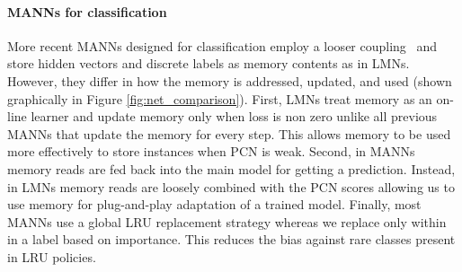 \documentclass[letterpaper]{article} %
\newcommand{\vek}[1]{{\bf {#1}}}
\newcommand{\vh}{{\vek{h}}}
\def\sunita#1{\todo [color=purple]{Sunita: #1}}
\begin{document}


\paragraph{MANNs for classification}
More recent MANNs designed for classification employ a looser coupling~\cite{kaiser2017,SantoroBBWL16} and store hidden vectors and discrete labels as memory contents as in LMNs. 
%
However, they differ in how the memory is addressed, updated, and used (shown graphically in Figure \ref{fig:net_comparison}).
First, LMNs treat memory as an on-line learner and update memory only when loss is non zero unlike all previous MANNs that update the memory for every step.  This allows memory to be used more effectively to store instances when PCN is weak.
Second, in MANNs memory reads are fed back into the main model for getting a prediction.  Instead, in LMNs memory reads are loosely combined with the PCN scores allowing us to use memory for plug-and-play adaptation of a trained model.  Finally, most MANNs use a global LRU replacement strategy whereas we replace only within in a label based on importance. This reduces the bias against rare classes present in LRU policies.




%
\end{document}
